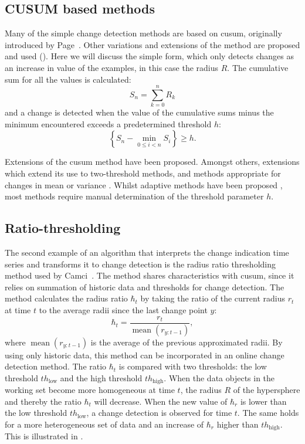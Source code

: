 \subsection{CUSUM based methods}
Many of the simple change detection methods are based on \gls{cusum}, originally introduced by Page~\cite{page1954continuous}.
Other variations and extensions of the method are proposed and used (\cite{inclan1994use,alippi2006adaptive,hsu2007mosum}).
Here we will discuss the simple form, which only detects changes as an increase in value of the examples, in this case the radius $R$.
The cumulative sum for all the values is calculated:
\begin{equation}
  S_n = \sum_{k=0}^n R_k
\end{equation}
and a change is detected when the value of the cumulative sums minus the minimum encountered exceeds a predetermined threshold $h$:
\begin{equation}
  \left\{ S_n - \operatorname*{min}_{0 \le i < n} S_i \right\} \ge h.
\end{equation}

Extensions of the \gls{cusum} method have been proposed.
Amongst others, extensions which extend its use to two-threshold methods, and methods appropriate for changes in mean or variance \cite{inclan1994use}.
Whilst adaptive methods have been proposed \cite{alippi2006adaptive}, most methods require manual determination of the threshold parameter $h$.

\subsection{Ratio-thresholding}\label{subsec:ratio_thresholding}
The second example of an algorithm that interprets the change indication time series and transforms it to change detection is the radius ratio thresholding method used by Camci~\cite{camci2010change}.
The method shares characteristics with \gls{cusum}, since it relies on summation of historic data and thresholds for change detection.
The method calculates the radius ratio $\hbar_t$ by taking the ratio of the current radius $r_t$ at time $t$ to the average radii since the last change point $y$:
\begin{equation}\label{eq:ratio_radius}
  \hbar_t = \frac{r_t}{\operatorname*{mean}(r_{y:t-1})},
\end{equation}
where $\operatorname*{mean}(r_{y:t-1})$ is the average of the previous approximated radii.
By using only historic data, this method can be incorporated in an online change detection method.
The ratio $\hbar_t$ is compared with two thresholds: the low threshold $th_\text{low}$ and the high threshold $th_\text{high}$.
When the data objects in the working set become more homogeneous at time $t$, the radius $R$ of the hypersphere and thereby the ratio $\hbar_t$ will decrease.
When the new value of $\hbar_r$ is lower than the low threshold $th_\text{low}$, a change detection is observed for time $t$.
The same holds for a more heterogeneous set of data and an increase of $\hbar_r$ higher than $th_\text{high}$.
This is illustrated in .

